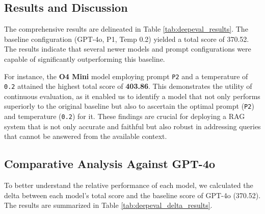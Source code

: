 \subsection{Results and Discussion}
The comprehensive results are delineated in Table \ref{tab:deepeval_results}. The baseline configuration (GPT-4o, P1, Temp 0.2) yielded a total score of 370.52. The results indicate that several newer models and prompt configurations were capable of significantly outperforming this baseline.

For instance, the \textbf{O4 Mini} model employing prompt \texttt{P2} and a temperature of \texttt{0.2} attained the highest total score of \textbf{403.86}. This demonstrates the utility of continuous evaluation, as it enabled us to identify a model that not only performs superiorly to the original baseline but also to ascertain the optimal prompt (\texttt{P2}) and temperature (\texttt{0.2}) for it. These findings are crucial for deploying a RAG system that is not only accurate and faithful but also robust in addressing queries that cannot be answered from the available context.



\subsection{Comparative Analysis Against GPT-4o}
\label{sec:comparative_analysis_gpt4o}

To better understand the relative performance of each model, we calculated the delta between each model's total score and the baseline score of GPT-4o (370.52). The results are summarized in Table \ref{tab:deepeval_delta_results}.

